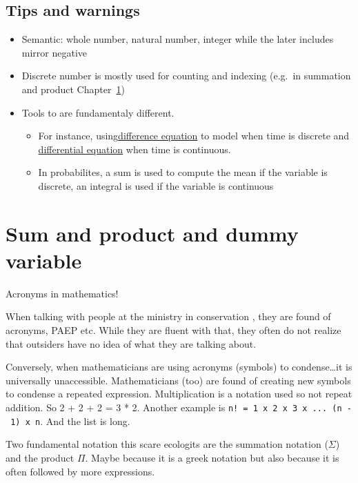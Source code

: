 \documentclass[
  letterpaper,
  DIV=11,
  numbers=noendperiod]{scrreprt}
\providecommand{\tightlist}{%
  \setlength{\itemsep}{0pt}\setlength{\parskip}{0pt}}
\begin{document}
\section*{Tips and warnings}\label{tips-and-warnings}


\begin{itemize}
\tightlist
\item
  Semantic: whole number, natural number, integer while the later
  includes mirror negative
\item
  Discrete number is mostly used for counting and indexing (e.g.~in
  summation and product Chapter~\ref{sec-sum})
\item
  Tools to are fundamentaly different.

  \begin{itemize}
  \tightlist
  \item
    For instance, using\href{@sec-difference}{difference equation} to
    model when time is discrete and
    \href{@sec-differential}{differential equation} when time is
    continuous.
  \item
    In probabilites, a sum is used to compute the mean if the variable
    is discrete, an integral is used if the variable is continuous
  \end{itemize}
\end{itemize}

\chapter{Sum and product and dummy variable}\label{sec-sum}

Acronyms in mathematics!

When talking with people at the ministry in conservation , they are
found of acronyms, PAEP etc. While they are fluent with that, they often
do not realize that outsiders have no idea of what they are talking
about.

Conversely, when mathematicians are using acronyms (symbols) to
condense\ldots it is universally unaccessible. Mathematicians (too) are
found of creating new symbols to condense a repeated expression.
Multiplication is a notation used so not repeat addition. So 2 + 2 + 2 =
3 * 2. Another example is
\texttt{n!\ =\ 1\ x\ 2\ x\ 3\ x\ ...\ (n\ -\ 1)\ x\ n}. And the list is
long.

Two fundamental notation this scare ecologits are the summation notation
(\(\Sigma\)) and the product \(\Pi\). Maybe because it is a greek
notation but also because it is often followed by more expressions.
\end{document}
